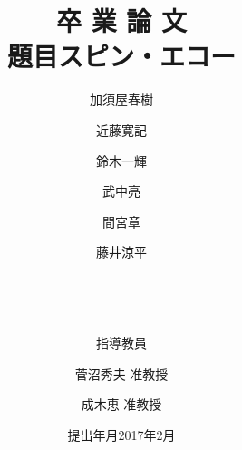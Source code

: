 \documentclass[uplatex, titlepage]{jsarticle}
\title{卒 業 論 文\\
題目\hspace{1cm}スピン・エコー}
\date{提出年月\quad2017年2月}
\author[$\dagger$]{加須屋春樹}
\author[$\dagger$]{近藤寛記}
\author[$\dagger$]{鈴木一輝}
\author[$\dagger$]{武中亮}
\author[$\dagger$]{間宮章}
\author[$\dagger$]{藤井涼平}
\author[ ]{\\}
\affil[$\dagger$]{京都大学 理学部}
\author[ ]{\\}
\author[ ]{指導教員\quad}
\author[*]{菅沼秀夫 准教授}
\author[*]{成木恵 准教授}
\affil[*]{京都大学 理学研究科}
\theoremstyle{definition}
\begin{document}
\maketitle
\tableofcontents
\nocite{test}


\end{document}
